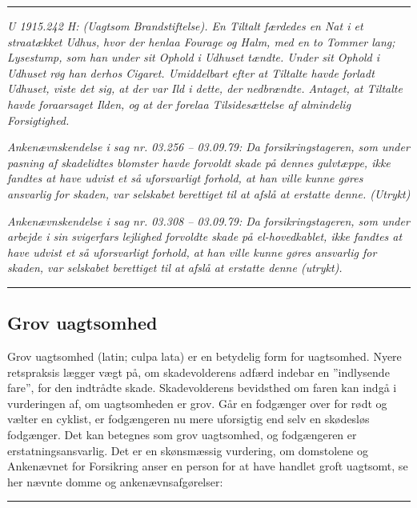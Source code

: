 \documentclass[]{book}
\begin{document}
\begin{center}\rule{0.5\linewidth}{\linethickness}\end{center}

\emph{U 1915.242 H: (Uagtsom Brandstiftelse). En Tiltalt færdedes en Nat i et straatækket Udhus, hvor der henlaa Fourage og Halm, med en to Tommer lang; Lysestump, som han under sit Ophold i Udhuset tændte. Under sit Ophold i Udhuset røg han derhos Cigaret. Umiddelbart efter at Tiltalte havde forladt Udhuset, viste det sig, at der var Ild i dette, der nedbrændte. Antaget, at Tiltalte havde foraarsaget Ilden, og at der forelaa Tilsidesættelse af almindelig Forsigtighed.}

\emph{Ankenævnskendelse i sag nr. 03.256 -- 03.09.79: Da forsikringstageren, som under pasning af skadelidtes blomster havde forvoldt skade på dennes gulvtæppe, ikke fandtes at have udvist et så uforsvarligt forhold, at han ville kunne gøres ansvarlig for skaden, var selskabet berettiget til at afslå at erstatte denne. (Utrykt)}

\emph{Ankenævnskendelse i sag nr. 03.308 -- 03.09.79: Da forsikringstageren, som under arbejde i sin svigerfars lejlighed forvoldte skade på el-hovedkablet, ikke fandtes at have udvist et så uforsvarligt forhold, at han ville kunne gøres ansvarlig for skaden, var selskabet berettiget til at afslå at erstatte denne (utrykt).}

\begin{center}\rule{0.5\linewidth}{\linethickness}\end{center}

\hypertarget{grov-uagtsomhed}{%
\subsection{Grov uagtsomhed}\label{grov-uagtsomhed}}

Grov uagtsomhed (latin; culpa lata) er en betydelig form for uagtsomhed. Nyere retspraksis lægger vægt på, om skadevolderens adfærd indebar en ''indlysende fare'', for den indtrådte skade. Skadevolderens bevidsthed om faren kan indgå i vurderingen af, om uagtsomheden er grov. Går en fodgænger over for rødt og vælter en cyklist, er fodgængeren nu mere uforsigtig end selv en skødesløs fodgænger. Det kan betegnes som grov uagtsomhed, og fodgængeren er erstatningsansvarlig. Det er en skønsmæssig vurdering, om domstolene og Ankenævnet for Forsikring anser en person for at have handlet groft uagtsomt, se her nævnte domme og ankenævnsafgørelser:

\begin{center}\rule{0.5\linewidth}{\linethickness}\end{center}
\end{document}

